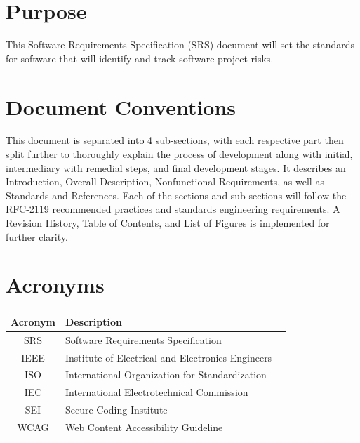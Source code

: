 \documentclass[letterpaper,12pt,oneside,listof=totoc,parskip=full]{scrreprt}
\begin{document}
\section{Purpose}
This Software Requirements Specification (SRS) document will set the standards for software that will identify and track software project risks.

\section{Document Conventions}
This document is separated into 4 sub-sections, with each respective part then split further to thoroughly explain the process of development along with initial, intermediary with remedial steps, and final development stages. It describes an Introduction, Overall Description, Nonfunctional Requirements, as well as Standards and References. Each of the sections and sub-sections will follow the RFC-2119 recommended practices and standards engineering requirements. A Revision History, Table of Contents, and List of Figures is implemented for further clarity.

\section{Acronyms}
\begin{tabular}{| c | p{} | p{} |}
\hline
Acronym     & Description \\
\hline
 SRS &  Software Requirements Specification\\
\hline
 IEEE & Institute of Electrical and Electronics Engineers\\
 \hline
 ISO & International Organization for Standardization\\ 
 \hline
 IEC & International Electrotechnical Commission\\
 \hline
 SEI & Secure Coding Institute\\
 \hline
 WCAG & Web Content Accessibility Guideline\\
 \hline
\end{tabular}

%
%
%
%
%
\end{document}
